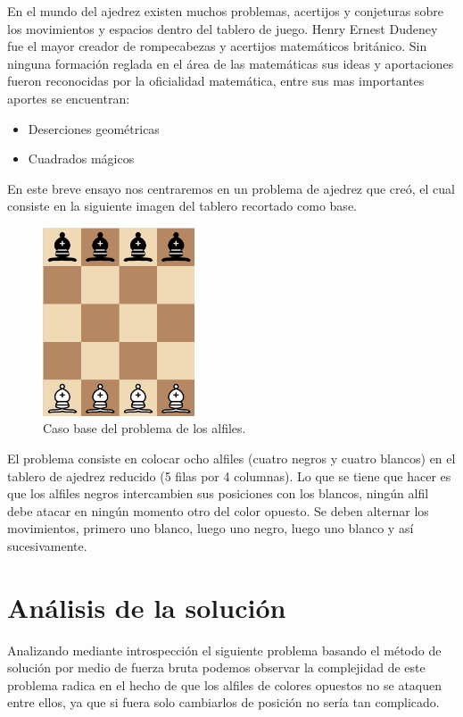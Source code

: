 \documentclass[12pt]{article}
\begin{document}
En el mundo del ajedrez existen muchos problemas, acertijos y conjeturas sobre los movimientos y espacios dentro del tablero de juego. Henry Ernest Dudeney fue el mayor creador de rompecabezas y acertijos matemáticos británico. Sin ninguna formación reglada en el área de las matemáticas sus ideas y aportaciones fueron reconocidas por la oficialidad matemática, entre sus mas importantes aportes se encuentran:
\begin{itemize}
    \item Deserciones geométricas
    \item Cuadrados mágicos 
\end{itemize}

En este breve ensayo nos centraremos en un problema de ajedrez que creó, el cual consiste en la siguiente imagen del tablero recortado como base.

\begin{figure}[h]
\centering
\includegraphics[width=0.4\textwidth]{1.png}
\caption{\label{fig:xx}Caso base del problema de los alfiles.}
\end{figure}

El problema consiste en colocar ocho alfiles (cuatro negros y cuatro blancos) en el tablero de ajedrez reducido (5 filas por 4 columnas). Lo que se tiene que hacer es que los alfiles negros intercambien sus posiciones con los blancos, ningún alfil debe atacar en ningún momento otro del color opuesto.
Se deben alternar los movimientos, primero uno blanco, luego uno negro, luego uno blanco y así sucesivamente.

\section{Análisis de la solución}

Analizando mediante introspección el siguiente problema basando el método de solución por medio de fuerza bruta podemos observar la complejidad de este problema radica en el hecho de que los alfiles de colores opuestos no se ataquen entre ellos, ya que si fuera solo cambiarlos de posición no sería tan complicado.\\
\end{document}
